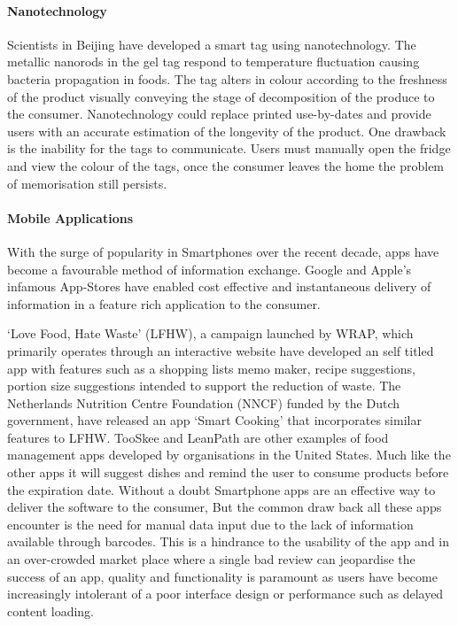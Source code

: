 \documentclass[a4paper, 11pt]{article}
\begin{document}
\paragraph{Nanotechnology}
Scientists in Beijing have developed a smart tag using nanotechnology. The metallic nanorods in the gel tag respond to temperature fluctuation causing bacteria propagation in foods. The tag alters in colour according to the freshness of the product visually conveying the stage of decomposition of the produce to the consumer. Nanotechnology could replace printed use-by-dates and provide users with an accurate estimation of the longevity of the product. One drawback is the inability for the tags to communicate. Users must manually open the fridge and view the colour of the tags, once the consumer leaves the home the problem of memorisation still persists.\cite{FoodWaste}

\paragraph{Mobile Applications}
With the surge of popularity in Smartphones over the recent decade, apps have become a favourable method of information exchange. Google and Apple's infamous App-Stores have enabled cost effective and instantaneous delivery of information in a feature rich application to the consumer.

`Love Food, Hate Waste' (LFHW), a campaign launched by WRAP, which primarily operates through an interactive website have developed an self titled app with features such as a shopping lists memo maker, recipe suggestions, portion size suggestions intended to support the reduction of waste. The Netherlands Nutrition Centre Foundation (NNCF) funded by the Dutch government, have released an app `Smart Cooking' that incorporates similar features to LFHW. TooSkee and LeanPath\cite{FoodWaste} are other examples of food management apps developed by organisations in the United States. Much like the other apps it will suggest dishes and remind the user to consume products before the expiration date. 
Without a doubt Smartphone apps are an effective way to deliver the software to the consumer, But the common draw back all these apps encounter is the need for manual data input due to the lack of information available through barcodes. This is a hindrance to the usability of the app and in an over-crowded market place where a single bad review can jeopardise the success of an app, quality and functionality is paramount as users have become increasingly intolerant of a poor interface design or performance such as delayed content loading.
\end{document}
